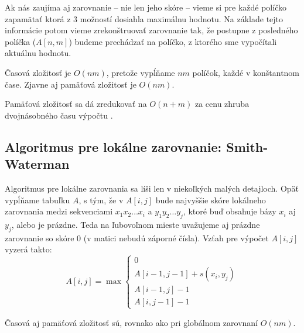 Ak nás zaujíma aj zarovnanie -- nie len jeho skóre -- vieme si pre každé políčko zapamätať ktorá z 3 možností dosiahla maximálnu hodnotu. Na základe tejto informácie potom vieme zrekonštruovať zarovnanie tak, že postupne z posledného políčka ($A[n,m]$) budeme prechádzať na políčko, z ktorého sme vypočítali aktuálnu hodnotu.

Časová zložitosť je $O(nm)$, pretože vypĺňame $nm$ políčok, každé v konštantnom čase. Zjavne aj pamäťová zložitosť je $O(nm)$.

Pamäťová zložitosť sa dá zredukovať na $O(n+m)$ za cenu zhruba dvojnásobného času výpočtu \cite{hirschberg}.

\subsection{Algoritmus pre lokálne zarovnanie: Smith-Waterman}


Algoritmus pre lokálne zarovnania sa líši len v niekoľkých malých detajloch. Opäť vypĺňame tabuľku $A$, s tým, že v $A[i,j]$ bude najvyššie skóre lokálneho zarovnania medzi sekvenciami $x_1x_2\dots x_i$ a $y_1y_2\dots y_j$, ktoré buď obsahuje bázy $x_i$ aj $y_j$, alebo je prázdne. Teda na ľubovoľnom mieste uvažujeme aj prázdne zarovnanie so skóre 0 (v matici nebudú záporné čísla). Vzťah pre výpočet $A[i,j]$ vyzerá takto:
$$A[i,j] = \max \left\{ 
\begin{array}{l}
0\\
A[i-1,j-1]+s(x_i, y_j)\\ 
A[i-1,j]-1\\
A[i,j-1]-1 
\end{array} \right.$$

Časová aj pamäťová zložitosť sú, rovnako ako pri globálnom zarovnaní $O(nm)$.